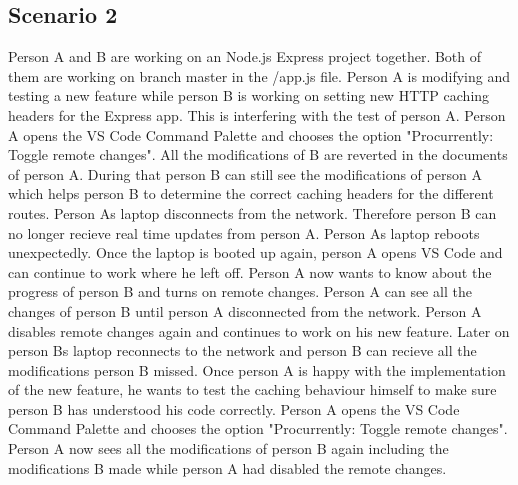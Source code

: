 \subsection{Scenario 2}
Person A and B are working on an Node.js Express project together. Both of them are working on branch master in the /app.js file.
Person A is modifying and testing a new feature while person B is working on setting new HTTP caching headers for the Express app.
This is interfering with the test of person A. Person A opens the VS Code Command Palette and chooses the option "Procurrently: Toggle remote changes".
All the modifications of B are reverted in the documents of person A.
During that person B can still see the modifications of person A which helps person B to determine the correct caching headers for the different routes.
Person As laptop disconnects from the network. Therefore person B can no longer recieve real time updates from person A.
Person As laptop reboots unexpectedly. Once the laptop is booted up again, person A opens VS Code and can continue to work where he left off.
Person A now wants to know about the progress of person B and turns on remote changes. Person A can see all the changes of person B until person A disconnected from the network. Person A disables remote changes again and continues to work on his new feature.
Later on person Bs laptop reconnects to the network and person B can recieve all the modifications person B missed.
Once person A is happy with the implementation of the new feature, he wants to test the caching behaviour himself to make sure person B has understood his code correctly.
Person A opens the VS Code Command Palette and chooses the option "Procurrently: Toggle remote changes".
Person A now sees all the modifications of person B again including the modifications B made while person A had disabled the remote changes.